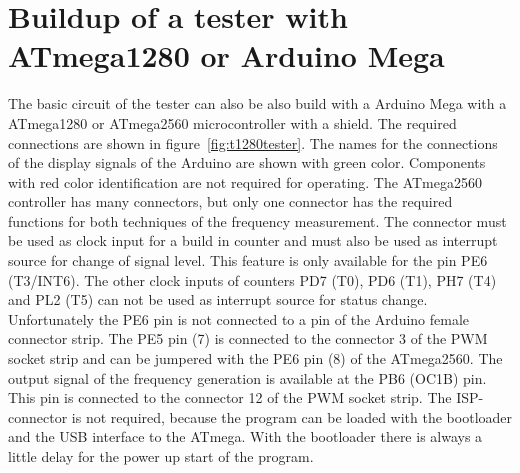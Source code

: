 \section{Buildup of a tester with ATmega1280 or Arduino Mega}
The basic circuit of the tester can also be also build with a Arduino Mega with a ATmega1280
or ATmega2560 microcontroller with a shield.
The required connections are shown in figure~\ref{fig:t1280tester}.
The names for the connections of the display signals of the Arduino are shown with green color.
Components with red color identification are not required for operating.
The ATmega2560 controller has many connectors, but only one connector has the required
functions for both techniques of the frequency measurement.
The connector must be used as clock input for a build in counter and must also be 
used as interrupt source for change of signal level.
This feature is only available for the pin PE6 (T3/INT6).
The other clock inputs of counters PD7 (T0), PD6 (T1), PH7 (T4) and PL2 (T5) can not be 
used as interrupt source for status change.
Unfortunately the PE6 pin is not connected to a pin of the Arduino female connector strip.
The PE5 pin (7) is connected to the connector 3 of the PWM socket strip and
can be jumpered with the PE6 pin (8) of the ATmega2560.
The output signal of the frequency generation is available at the PB6 (OC1B) pin.
This pin is connected to the connector 12 of the PWM socket strip.
The ISP-connector is not required, because the program can be loaded with the bootloader
and the USB interface to the ATmega. With the bootloader there is always a
little delay for the power up start of the program.


